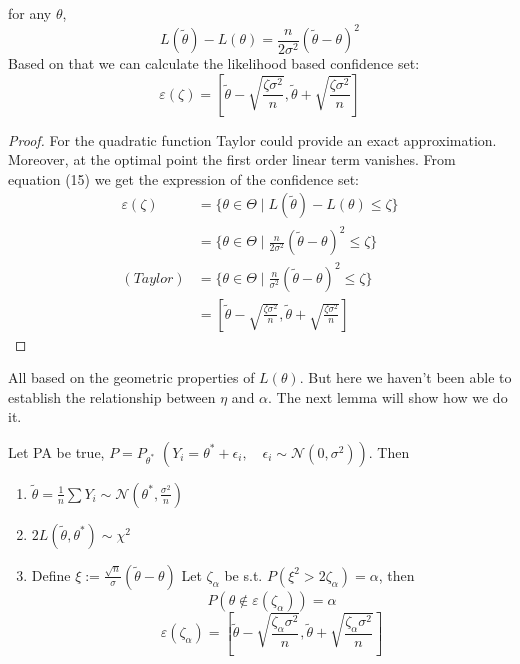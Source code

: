 \begin{lemma}
	for any $\theta$, 
	\begin{equation}
		L(\tilde{\theta}) - L(\theta) = \frac{n}{2 \sigma^2}(\tilde{\theta} - \theta)^2
	\end{equation}
	Based on that we can calculate the likelihood based confidence set:
	\begin{equation*}
		\varepsilon(\zeta) = \left[\tilde{\theta} - \sqrt{\frac{\zeta \sigma^2}{n}}, \tilde{\theta} + \sqrt{\frac{\zeta \sigma^2}{n}} \right ]
	\end{equation*}
\end{lemma}

\begin{proof}
	For the quadratic function Taylor could provide an exact approximation. Moreover, at the optimal point the first order linear term vanishes. From equation (15) we get the expression of the confidence set:
	\begin{align*}
		\varepsilon(\zeta) &= \{ \theta \in \Theta \mid L(\tilde{\theta}) - L(\theta) \leq \zeta \} \\
		&= \{ \theta \in \Theta \mid \frac{n}{2 \sigma^2}(\tilde{\theta} - \theta)^2 \leq \zeta \}\\
		(Taylor) &=  \{ \theta \in \Theta \mid \frac{n}{\sigma^2}(\tilde{\theta} - \theta)^2 \leq \zeta \}\\
		&= \left[\tilde{\theta} - \sqrt{\frac{\zeta \sigma^2}{n}}, \tilde{\theta} + \sqrt{\frac{\zeta \sigma^2}{n}} \right ]
	\end{align*}
\end{proof}

\begin{remark}
All based on the geometric properties of $L(\theta)$. But here we haven't been able to establish the relationship between $\eta$ and $\alpha$. The next lemma will show how we do it.
\end{remark}

\begin{lemma}
	Let PA be true, $P = P_{\theta^*}$ $(Y_i = \theta^* + \epsilon_i, \quad \epsilon_i \sim \mathcal{N}(0, \sigma^2))$. Then
	\begin{enumerate}
		\item $\tilde{\theta} = \frac{1}{n} \sum Y_i \sim \mathcal{N}(\theta^*, \frac{\sigma^2}{n})$
		\item $2L(\tilde{\theta}, \theta^*) \sim \chi^2$
		\item Define $\xi := \frac{\sqrt{n}}{\sigma}(\tilde{\theta} - \theta)$ Let $\zeta_\alpha$ be s.t. $P(\xi^2 > 2 \zeta_\alpha) = \alpha$, then
		\begin{equation*}
			P(\theta \notin \varepsilon(\zeta_\alpha)) = \alpha
		\end{equation*}
		\begin{equation*}
			\varepsilon(\zeta_\alpha) = \left[\tilde{\theta} - \sqrt{\frac{\zeta_\alpha \sigma^2}{n}}, \tilde{\theta} + \sqrt{\frac{\zeta_\alpha \sigma^2}{n}} \right ]
		\end{equation*}
	\end{enumerate}
\end{lemma}

